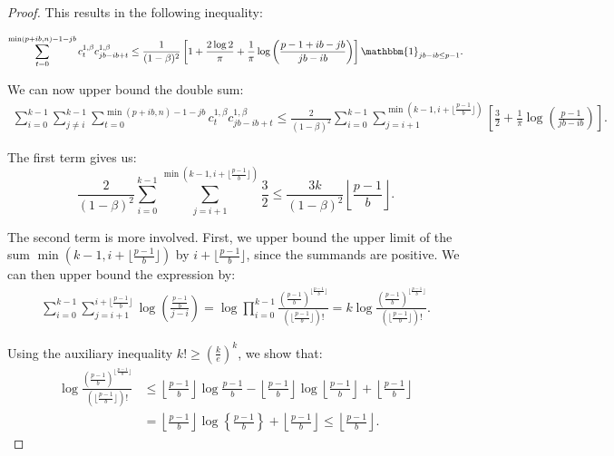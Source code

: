 \documentclass{article} %
\begin{document}
\begin{proof}
This results in the following inequality:

\begin{equation}    
\sum\limits_{t = 0}^{\min(p + ib, n) - 1- jb}c^{1,\beta}_{t} c^{1,\beta}_{jb - ib + t} \le \frac{1}{(1 - \beta)^2}\left[1 + \frac{2\log 2}{\pi } + \frac{1}{\pi}\log\left(\frac{p - 1 + ib - jb}{jb - ib}\right) \right] \mathbbm{1}_{jb - ib \le p - 1}.
\end{equation}

We can now upper bound the double sum:
\begin{equation}
\begin{aligned}
\sum\limits_{i = 0}^{k - 1}\sum\limits_{j \ne i}^{k - 1} \sum\limits_{t = 0}^{\min(p + ib, n) - 1- jb} c^{1,\beta}_t c^{1,\beta}_{jb -ib + t} \le \frac{2}{(1 - \beta)^2}\sum\limits_{i = 0}^{k - 1} \sum\limits_{j = i + 1}^{\min(k - 1, i + \lfloor\frac{p - 1}{b}\rfloor)}\left[\frac{3}{2} + \frac{1}{\pi}\log\left(\frac{p - 1}{jb - ib}\right) \right].
\end{aligned}
\end{equation}

The first term gives us:
\begin{equation}
    \frac{2}{(1 - \beta)^2}\sum\limits_{i = 0}^{k - 1} \sum\limits_{j = i + 1}^{\min(k - 1, i + \lfloor\frac{p - 1}{b}\rfloor)}\frac{3}{2} \le \frac{3k}{(1 - \beta)^2}\left\lfloor\frac{p - 1}{b}\right\rfloor.
\end{equation}

The second term is more involved. First, we upper bound the upper limit of the sum $\min(k - 1, i + \lfloor\frac{p - 1}{b}\rfloor)$ by $i + \lfloor\frac{p - 1}{b}\rfloor$, since the summands are positive. We can then upper bound the expression by:
\begin{equation}
\begin{aligned}
    \sum\limits_{i = 0}^{k - 1} \sum\limits_{j = i + 1}^{i + \lfloor\frac{p - 1}{b}\rfloor}\log\left(\frac{\frac{p - 1}{b}}{j - i}\right) = \log \prod\limits_{ i = 0}^{k - 1} \frac{(\frac{p - 1}{b})^{\lfloor\frac{p - 1}{b}\rfloor}}{(\lfloor\frac{p - 1}{b}\rfloor)!} = k\log \frac{(\frac{p - 1}{b})^{\lfloor\frac{p - 1}{b}\rfloor}}{(\lfloor\frac{p - 1}{b}\rfloor)!}.
\end{aligned}
\end{equation}

Using the auxiliary inequality $k! \ge (\frac{k}{e})^k$, we show that:
\begin{equation}
\begin{aligned}
\log \frac{(\frac{p - 1}{b})^{\lfloor\frac{p - 1}{b}\rfloor}}{(\lfloor\frac{p - 1}{b}\rfloor)!} &\le \left\lfloor\frac{p - 1}{b}\right\rfloor\log \frac{p - 1}{b} -\left\lfloor\frac{p - 1}{b}\right\rfloor \log \left\lfloor\frac{p - 1}{b}\right\rfloor + \left\lfloor\frac{p - 1}{b}\right\rfloor\\
&= \left\lfloor\frac{p - 1}{b}\right\rfloor\log \left\{\frac{p - 1}{b}\right\} + \left\lfloor\frac{p - 1}{b}\right\rfloor \le  \left\lfloor\frac{p - 1}{b}\right\rfloor.
\end{aligned}
\end{equation}


\end{proof}
\end{document}
